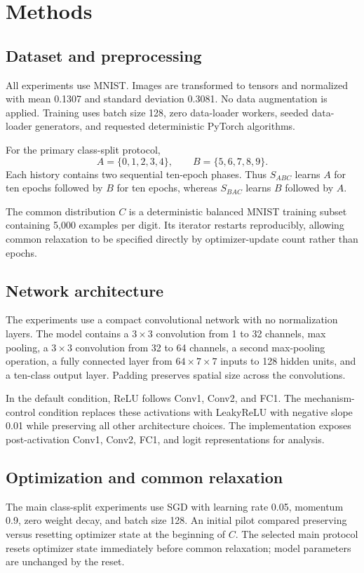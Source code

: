 \documentclass[11pt,a4paper]{article}
\newcommand{\sabc}{S_{ABC}}
\newcommand{\sbac}{S_{BAC}}
\begin{document}
\section{Methods}

\subsection{Dataset and preprocessing}
All experiments use MNIST. Images are transformed to tensors and normalized with mean 0.1307 and standard deviation 0.3081. No data augmentation is applied. Training uses batch size 128, zero data-loader workers, seeded data-loader generators, and requested deterministic PyTorch algorithms.

For the primary class-split protocol,
\[
A=\{0,1,2,3,4\}, \qquad B=\{5,6,7,8,9\}.
\]
Each history contains two sequential ten-epoch phases. Thus $\sabc$ learns $A$ for ten epochs followed by $B$ for ten epochs, whereas $\sbac$ learns $B$ followed by $A$.

The common distribution $C$ is a deterministic balanced MNIST training subset containing 5,000 examples per digit. Its iterator restarts reproducibly, allowing common relaxation to be specified directly by optimizer-update count rather than epochs.

\subsection{Network architecture}
The experiments use a compact convolutional network with no normalization layers. The model contains a $3\times3$ convolution from 1 to 32 channels, max pooling, a $3\times3$ convolution from 32 to 64 channels, a second max-pooling operation, a fully connected layer from $64\times7\times7$ inputs to 128 hidden units, and a ten-class output layer. Padding preserves spatial size across the convolutions.

In the default condition, ReLU follows Conv1, Conv2, and FC1. The mechanism-control condition replaces these activations with LeakyReLU with negative slope 0.01 while preserving all other architecture choices. The implementation exposes post-activation Conv1, Conv2, FC1, and logit representations for analysis.

\subsection{Optimization and common relaxation}
The main class-split experiments use SGD with learning rate 0.05, momentum 0.9, zero weight decay, and batch size 128. An initial pilot compared preserving versus resetting optimizer state at the beginning of $C$. The selected main protocol resets optimizer state immediately before common relaxation; model parameters are unchanged by the reset.
\end{document}
